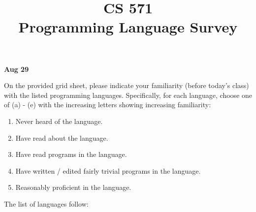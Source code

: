 \documentclass[12pt]{article}
\title{CS 571\\Programming Language Survey}
\date{}
\begin{document}
\maketitle

\begin{flushleft}
\textbf{Aug 29}%

\vspace{0.5cm}


On the provided grid sheet, please indicate your familiarity (before
today's class) with the listed programming languages.  Specifically,
for each language, choose one of (a) - (e) with the increasing letters
showing increasing familiarity:

\end{flushleft}


\renewcommand{\labelenumi}{\alph{enumi}) }
\begin{enumerate}

\item Never heard of the language.

\item Have read about the language.

\item Have read programs in the language.

\item Have written / edited fairly trivial programs in the language.

\item Reasonably proficient in the language.

\end{enumerate}

\newpage

The list of languages follow:

\renewcommand{\labelenumi}{\arabic{enumi}. }
\end{document}
